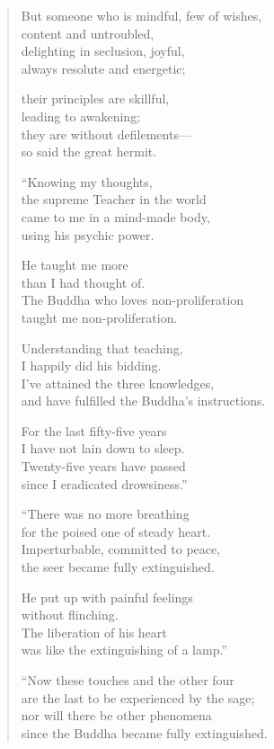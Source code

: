 \documentclass[12pt,openany]{book}%
\begin{document}
\begin{verse}
But someone who is mindful, few of wishes, \\
content and untroubled, \\
delighting in seclusion, joyful, \\
always resolute and energetic; 

their principles are skillful, \\
leading to awakening; \\
they are without defilements—\\
so said the great hermit. 

“Knowing my thoughts, \\
the supreme Teacher in the world \\
came to me in a mind-made body, \\
using his psychic power. 

He taught me more \\
than I had thought of. \\
The Buddha who loves non-proliferation \\
taught me non-proliferation. 

Understanding that teaching, \\
I happily did his bidding. \\
I’ve attained the three knowledges, \\
and have fulfilled the Buddha’s instructions. 

For the last fifty-five years \\
I have not lain down to sleep. \\
Twenty-five years have passed \\
since I eradicated drowsiness.” 

“There was no more breathing \\
for the poised one of steady heart. \\
Imperturbable, committed to peace, \\
the seer became fully extinguished. 

He put up with painful feelings \\
without flinching. \\
The liberation of his heart \\
was like the extinguishing of a lamp.” 

“Now these touches and the other four \\
are the last to be experienced by the sage; \\
nor will there be other phenomena \\
since the Buddha became fully extinguished. 


\end{verse}
\end{document}
